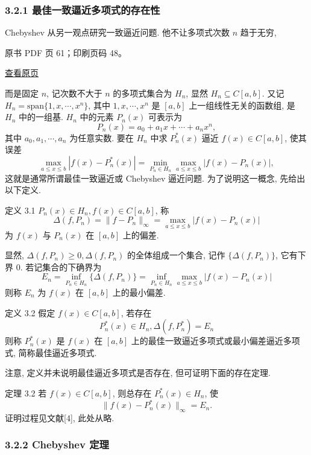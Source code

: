 \subsubsection{3.2.1 最佳一致逼近多项式的存在性}\label{ch03a-ux6700ux4f73ux4e00ux81f4ux903cux8fd1ux591aux9879ux5f0fux7684ux5b58ux5728ux6027}

Chebyshev 从另一观点研究一致逼近问题. 他不让多项式次数 \(n\) 趋于无穷,

\clearpage

原书 PDF 页 61；印刷页码 48。

\href{source-images/pdf-061.jpeg}{查看原页}

而是固定 \(n\), 记次数不大于 \(n\) 的多项式集合为 \(H_n\), 显然 \(H_n \subseteq C[a,b]\). 又记 \(H_n = \text{span}\{1,x,\cdots,x^n\}\), 其中 \(1,x,\cdots,x^n\) 是 \([a,b]\) 上一组线性无关的函数组, 是 \(H_n\) 中的一组基. \(H_n\) 中的元素 \(P_n(x)\) 可表示为 \[
P_n(x) = a_0 + a_1x + \cdots + a_nx^n,
\] 其中 \(a_0,a_1,\cdots,a_n\) 为任意实数. 要在 \(H_n\) 中求 \(P_n^*(x)\) 逼近 \(f(x) \in C[a,b]\), 使其误差 \[
\max_{a \leqslant x \leqslant b} |f(x) - P_n^*(x)| = \min_{P_n \in H_n} \max_{a \leqslant x \leqslant b} |f(x) - P_n(x)|,
\] 这就是通常所谓最佳一致逼近或 Chebyshev 逼近问题. 为了说明这一概念, 先给出以下定义.

定义 3.1 \(P_n(x) \in H_n, f(x) \in C[a,b]\), 称 \[
\Delta(f,P_n) = \|f - P_n\|_\infty = \max_{a \leqslant x \leqslant b} |f(x) - P_n(x)| \tag{3.2.1}
\] 为 \(f(x)\) 与 \(P_n(x)\) 在 \([a,b]\) 上的偏差.

显然, \(\Delta(f,P_n) \geqslant 0, \Delta(f,P_n)\) 的全体组成一个集合, 记作 \(\{\Delta(f,P_n)\}\), 它有下界 0. 若记集合的下确界为 \[
E_n = \inf_{P_n \in H_n} \{\Delta(f,P_n)\} = \inf_{P_n \in H_n} \max_{a \leqslant x \leqslant b} |f(x) - P_n(x)| \tag{3.2.2}
\] 则称 \(E_n\) 为 \(f(x)\) 在 \([a,b]\) 上的最小偏差.

定义 3.2 假定 \(f(x) \in C[a,b]\), 若存在 \[
P_n^*(x) \in H_n, \Delta(f,P_n^*) = E_n \tag{3.2.3}
\] 则称 \(P_n^*(x)\) 是 \(f(x)\) 在 \([a,b]\) 上的最佳一致逼近多项式或最小偏差逼近多项式, 简称最佳逼近多项式.

注意, 定义并未说明最佳逼近多项式是否存在, 但可证明下面的存在定理.

定理 3.2 若 \(f(x) \in C[a,b]\), 则总存在 \(P_n^*(x) \in H_n\), 使 \[
\|f(x) - P_n^*(x)\|_\infty = E_n.
\] 证明过程见文献{[}4{]}, 此处从略.

\subsubsection{3.2.2 Chebyshev 定理}\label{ch03a-chebyshev-ux5b9aux7406}

